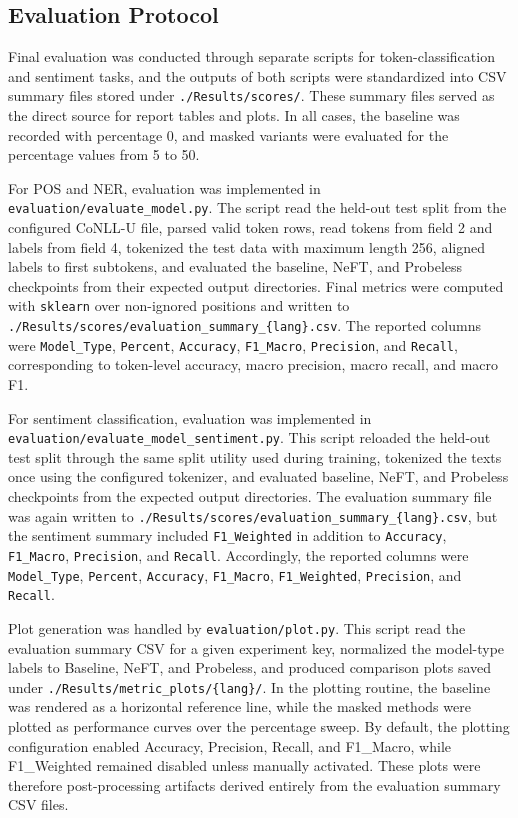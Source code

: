 \documentclass[12pt]{article}
\begin{document}
\subsection{Evaluation Protocol}

Final evaluation was conducted through separate scripts for token-classification and sentiment tasks, and the outputs of both scripts were standardized into CSV summary files stored under \texttt{./Results/scores/}. These summary files served as the direct source for report tables and plots. In all cases, the baseline was recorded with percentage 0, and masked variants were evaluated for the percentage values from 5 to 50.

For POS and NER, evaluation was implemented in \texttt{evaluation/evaluate\_model.py}. The script read the held-out test split from the configured CoNLL-U file, parsed valid token rows, read tokens from field 2 and labels from field 4, tokenized the test data with maximum length 256, aligned labels to first subtokens, and evaluated the baseline, NeFT, and Probeless checkpoints from their expected output directories. Final metrics were computed with \texttt{sklearn} over non-ignored positions and written to \texttt{./Results/scores/evaluation\_summary\_\{lang\}.csv}. The reported columns were \texttt{Model\_Type}, \texttt{Percent}, \texttt{Accuracy}, \texttt{F1\_Macro}, \texttt{Precision}, and \texttt{Recall}, corresponding to token-level accuracy, macro precision, macro recall, and macro F1.

For sentiment classification, evaluation was implemented in \texttt{evaluation/evaluate\_model\_sentiment.py}. This script reloaded the held-out test split through the same split utility used during training, tokenized the texts once using the configured tokenizer, and evaluated baseline, NeFT, and Probeless checkpoints from the expected output directories. The evaluation summary file was again written to \texttt{./Results/scores/evaluation\_summary\_\{lang\}.csv}, but the sentiment summary included \texttt{F1\_Weighted} in addition to \texttt{Accuracy}, \texttt{F1\_Macro}, \texttt{Precision}, and \texttt{Recall}. Accordingly, the reported columns were \texttt{Model\_Type}, \texttt{Percent}, \texttt{Accuracy}, \texttt{F1\_Macro}, \texttt{F1\_Weighted}, \texttt{Precision}, and \texttt{Recall}.

Plot generation was handled by \texttt{evaluation/plot.py}. This script read the evaluation summary CSV for a given experiment key, normalized the model-type labels to Baseline, NeFT, and Probeless, and produced comparison plots saved under \texttt{./Results/metric\_plots/\{lang\}/}. In the plotting routine, the baseline was rendered as a horizontal reference line, while the masked methods were plotted as performance curves over the percentage sweep. By default, the plotting configuration enabled Accuracy, Precision, Recall, and F1\_Macro, while F1\_Weighted remained disabled unless manually activated. These plots were therefore post-processing artifacts derived entirely from the evaluation summary CSV files.
\end{document}
